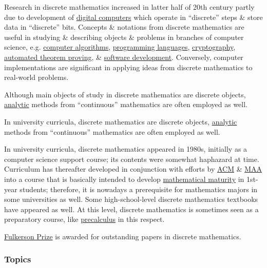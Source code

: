\documentclass{article}
\begin{document}
Research in discrete mathematics increased in latter half of 20th century partly due to development of \href{https://en.wikipedia.org/wiki/Digital_computers}{digital computers} which operate in ``discrete'' steps \& store data in ``discrete'' bits. Concepts \& notations from discrete mathematics are useful in studying \& describing objects \& problems in branches of computer science, e.g. \href{https://en.wikipedia.org/wiki/Computer_algorithm}{computer algorithms}, \href{https://en.wikipedia.org/wiki/Programming_language}{programming languages}, \href{https://en.wikipedia.org/wiki/Cryptography}{cryptography}, \href{https://en.wikipedia.org/wiki/Automated_theorem_proving}{automated theorem proving}, \& \href{https://en.wikipedia.org/wiki/Software_development}{software development}. Conversely, computer implementations are significant in applying ideas from discrete mathematics to real-world problems.

Although main objects of study in discrete mathematics are discrete objects, \href{https://en.wikipedia.org/wiki/Analysis_(mathematics)}{analytic} methods from ``continuous'' mathematics are often employed as well.

In university curricula, discrete mathematics are discrete objects, \href{https://en.wikipedia.org/wiki/Analysis_(mathematics)}{analytic} methods from ``continuous'' mathematics are often employed as well.

In university curricula, discrete mathematics appeared in 1980s, initially as a computer science support course; its contents were somewhat haphazard at time. Curriculum has thereafter developed in conjunction with efforts by \href{https://en.wikipedia.org/wiki/Association_for_Computing_Machinery}{ACM} \& \href{https://en.wikipedia.org/wiki/Mathematical_Association_of_America}{MAA} into a course that is basically intended to develop \href{https://en.wikipedia.org/wiki/Mathematical_maturity}{mathematical maturity} in 1st-year students; therefore, it is nowadays a prerequisite for mathematics majors in some universities as well. Some high-school-level discrete mathematics textbooks have appeared as well. At this level, discrete mathematics is sometimes seen as a preparatory course, like \href{https://en.wikipedia.org/wiki/Precalculus}{precalculus} in this respect.

\href{https://en.wikipedia.org/wiki/Fulkerson_Prize}{Fulkerson Prize} is awarded for outstanding papers in discrete mathematics.

\subsubsection{Topics}
\end{document}
